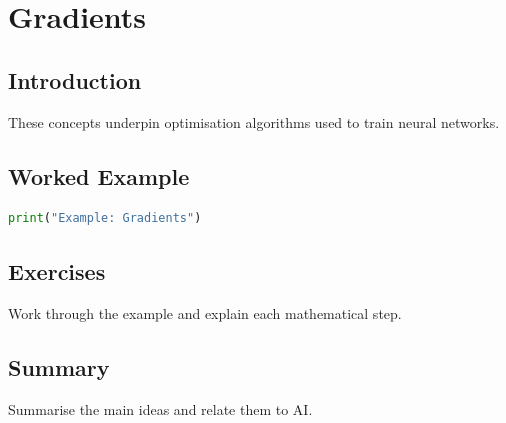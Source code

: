 \chapter{Gradients}
\label{chap:vol4-17}



\section{Introduction}
These concepts underpin optimisation algorithms used to train neural networks.

\section{Worked Example}
\begin{lstlisting}[language=Python]
print("Example: Gradients")
\end{lstlisting}

\section{Exercises}
\begin{exercise}
Work through the example and explain each mathematical step.
\end{exercise}

\section{Summary}
Summarise the main ideas and relate them to AI.

